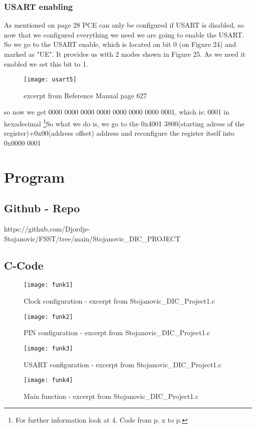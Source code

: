 \documentclass[11pt]{scrartcl}
\begin{document}
	\subsubsection{USART enabling}
As mentioned on page 28 PCE can only be configured if USART is disabled, so now that we configured everything we need we are going to enable the USART.
So we go to the USART enable, which is located on bit 0 (on Figure 24) and marked as "UE". It provides us with 2 modes shown in Figure 25. As we need it enabled we set this bit to 1.
\begin{figure}[h]
		\centering
		\texttt{[image: usart5]}
		\caption{excerpt from Reference Manual page 627}
\end{figure}
\newline
so now we get 0000 0000 0000 0000 0000 0000 0000 0001, which is: 0001 in hexadecimal
\newline\newline
\footnote{\label{foot:24}For further information look at 4. Code from p. x to p.}So what we do is, we go to the 0x4001 3800(starting adress of the register)+0x00(address offset) address and reconfigure the register itself into 0x0000 0001



\newpage
	\section{Program}
	\subsection{Github - Repo}
	https://github.com/Djordje-Stojanovic/FSST/tree/main/Stojanovic\_DIC\_PROJECT
	\subsection{C-Code}
\begin{figure}[h]
		\centering
		\texttt{[image: funk1]}
		\caption{Clock configuration - excerpt from Stojanovic\_DIC\_Project1.c}
\end{figure}
\begin{figure}[h]
		\centering
		\texttt{[image: funk2]}
		\caption{PIN configuration - excerpt from Stojanovic\_DIC\_Project1.c}
\end{figure}
\begin{figure}[h]
		\centering
		\texttt{[image: funk3]}
		\caption{USART configuration - excerpt from Stojanovic\_DIC\_Project1.c}
\end{figure}
\begin{figure}[h]
		\centering
		\texttt{[image: funk4]}
		\caption{Main function - excerpt from Stojanovic\_DIC\_Project1.c}
\end{figure}
	

	
\end{document}
